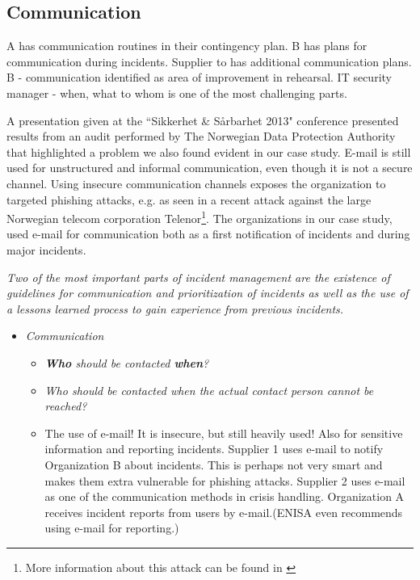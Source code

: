 \subsection{Communication}
A has communication routines in their contingency plan. B has plans for communication during incidents. Supplier to has additional communication plans. B - communication identified as area of improvement in rehearsal. IT security manager - when, what to whom is one of the most challenging parts.

A presentation given at the ``Sikkerhet \& S\aa rbarhet 2013" conference presented results from an audit performed by The Norwegian Data Protection Authority that highlighted a problem we also found evident in our case study. E-mail is still used for unstructured and informal communication, even though it is not a secure channel. Using insecure communication channels exposes the organization to targeted phishing attacks, e.g. as seen in a recent attack against the large Norwegian telecom corporation Telenor\footnote{More information about this attack can be found in \cite{phisingattack}}. The organizations in our case study, used e-mail for communication both as a first notification of incidents and during major incidents. 

\textit{Two of the most important parts of incident management are the existence of guidelines for communication and prioritization of incidents as well as the use of a lessons learned process to gain experience from previous incidents. \cite{nist800-61}}

\begin{itemize}
\item \textit{Communication}
\begin{itemize}
\item \textit{\textbf{Who} should be contacted \textbf{when}?}
\item \textit{Who should be contacted when the actual contact person cannot be reached?}
\item The use of e-mail! It is insecure, but still heavily used! Also for sensitive information and reporting incidents. Supplier 1 uses e-mail to notify Organization B about incidents. This is perhaps not very smart and makes them extra vulnerable for phishing attacks. Supplier 2 uses e-mail as one of the communication methods in crisis handling. Organization A receives incident reports from users by e-mail.(ENISA even recommends using e-mail for reporting.)
\end{itemize}
\end{itemize}

